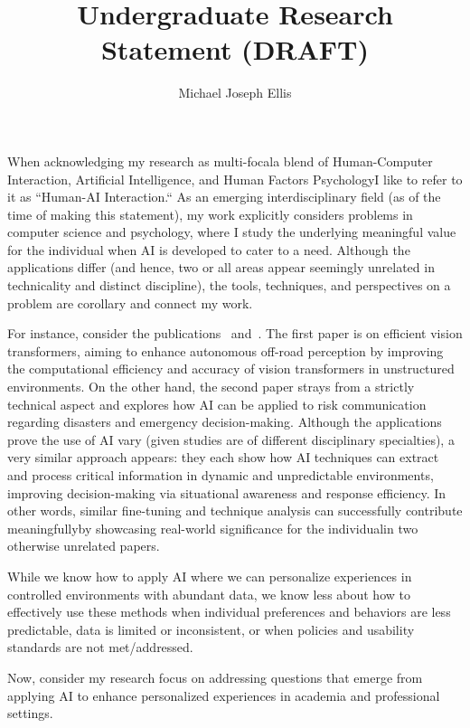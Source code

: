 \documentclass{article}
\title{Undergraduate Research Statement (DRAFT)}
\author{Michael Joseph Ellis}
\date{}
\begin{document}
\maketitle

\indent When acknowledging my research as multi-focal\textemdash a 
blend of Human-Computer Interaction, Artificial Intelligence, and Human Factors Psychology\textemdash I like to refer to it 
as ``Human-AI Interaction.`` As an emerging interdisciplinary field (as of the time of making this statement), my work 
explicitly considers problems in computer science and psychology, where I study the underlying meaningful value for the 
individual when AI is developed to cater to a need. Although the applications differ (and hence, two or all areas appear seemingly 
unrelated in technicality and distinct discipline), the tools, techniques, and perspectives on a problem are corollary and connect my work.

\indent For instance, consider the publications~\cite{Efficient-Vision-Transformers-for-Autonomous-Systems} 
and~\cite{AI-In-Disaster-Risk-Communication}. The first paper is on efficient vision transformers, aiming to enhance autonomous off-road 
perception by improving the computational efficiency and accuracy of vision transformers in unstructured environments. On the other hand, 
the second paper strays from a strictly technical aspect and explores how AI can be applied to risk communication regarding disasters and 
emergency decision-making. Although the applications prove the use of AI vary (given studies are of different disciplinary specialties), 
a very similar approach appears: they each show how AI techniques can extract and process critical information in dynamic and unpredictable 
environments, improving decision-making via situational awareness and response efficiency. In other words, similar fine-tuning and technique 
analysis can successfully contribute meaningfully\textemdash by showcasing real-world significance for the individual\textemdash in 
two otherwise unrelated papers.

\indent While we know how to apply AI where we can personalize experiences in controlled environments with abundant data, we know less about 
how to effectively use these methods when individual preferences and behaviors are less predictable, data is limited or inconsistent, or when 
policies and usability standards are not met/addressed. 

\indent Now, consider my research focus on addressing questions that emerge from applying AI to enhance personalized experiences 
in academia and professional settings.  
\end{document}
